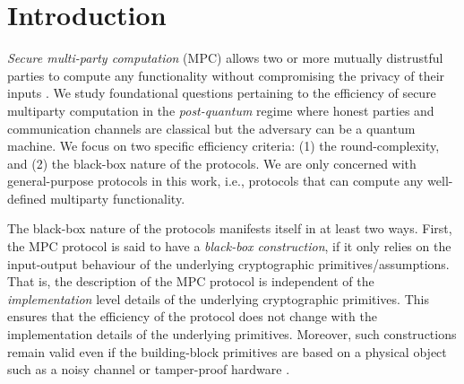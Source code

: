 




\section{Introduction}

{\em Secure multi-party computation} (MPC) allows two or more mutually distrustful parties to compute any functionality without compromising the privacy of their inputs \cite{FOCS:Yao86,STOC:GolMicWig87}. We study foundational questions pertaining to the efficiency of secure multiparty computation in the {\em post-quantum} regime where honest parties and communication channels are classical but the adversary can be a quantum machine. We focus on two specific efficiency criteria: (1) the round-complexity, and (2) the black-box nature of the protocols. We are only concerned with general-purpose protocols in this work, i.e., protocols that can compute any well-defined multiparty functionality.

The black-box nature of the protocols manifests itself in at least two ways. First, the MPC protocol is said to have a {\em black-box construction}, if it only relies on the input-output behaviour of the underlying cryptographic primitives/assumptions. That is, the description of the MPC protocol is independent of the {\em implementation} level details of the underlying cryptographic primitives. This ensures that the efficiency of the protocol does not change with the implementation details of the underlying primitives. Moreover, such constructions remain valid even if the building-block primitives are based on a physical object such as a noisy channel or tamper-proof hardware \cite{wyner1975wire,FOCS:CreKil88,TCC:GLMMR04}.



